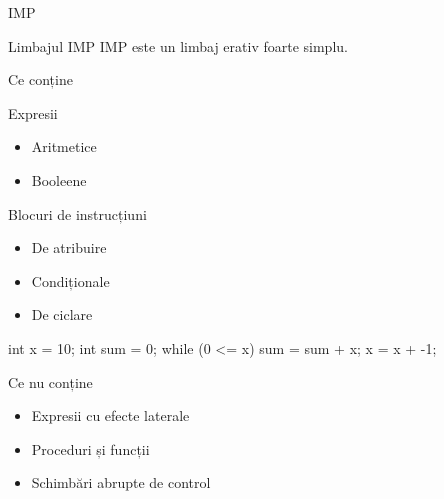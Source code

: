\documentclass[xcolor=pdftex,romanian,colorlinks]{beamer}
\begin{document}
\begin{subsection}{IMP}
\begin{frame}[fragile]{Limbajul IMP}
IMP este un limbaj erativ foarte simplu.
\begin{block}{Ce conține}
\begin{minipage}{.49\columnwidth}
\begin{itemize}
\vitem Expresii
\begin{itemize}
  \item Aritmetice%
  \item Booleene%
\end{itemize}
\vitem Blocuri de instrucțiuni
\begin{itemize}
  \item De atribuire%
  \item Condiționale%
  \item De ciclare  %
\end{itemize}
\end{itemize}
\end{minipage}
\begin{minipage}{.49\columnwidth}
\begin{asciic}
int x = 10;
int sum = 0;
while (0 <= x) {
  sum = sum + x;
  x = x + -1;
}
\end{asciic}
\end{minipage}
\end{block}
\begin{block}{Ce nu conține}
\begin{itemize}
\item Expresii cu efecte laterale
\item Proceduri și funcții
\item Schimbări abrupte de control
\end{itemize}
\end{block}
\end{frame}

\begin{comment}
 \begin{frame}{Sintaxă formală}{Backus Naur Form}
  \begin{itemize}
   \item Pentru gramatici (generative) independente de context
   \item Producții
       --- generează termeni prin expandare (rescriere)


\end{comment}
\end{subsection}
\end{document}
